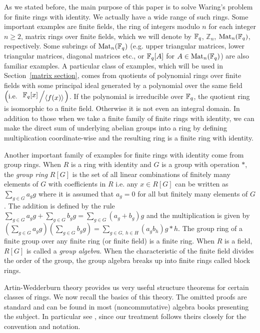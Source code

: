 \documentclass[11pt,reqno]{amsart}
\newcommand{\bigslant}[2]{{\raisebox{.2em}{$#1$}\left/\raisebox{-.2em}{$#2$}\right.}}
\begin{document}
As we stated before, the main purpose of this paper is to solve Waring's problem for finite rings with identity. We actually have a wide range of such rings. Some important examples are finite fields, the ring of integers modulo $n$ for each integer $n\geqslant 2$, matrix rings over finite fields, which we will denote by $\Bbb F_q$, $\mathbb{Z}_{n}$, $\operatorname{Mat}_n(\Bbb F_q)$, respectively. Some subrings of $\operatorname{Mat}_n(\Bbb F_q)$ (e.g. upper triangular matrices, lower triangular matrices, diagonal matrices etc., or $\Bbb F_q[A]$ for $A \in \operatorname{Mat}_n(\Bbb F_q)$) are also familiar examples. A particular class of examples, which will be used in Section~\ref{matrix section}, comes from quotients of polynomial rings over finite fields with some principal ideal generated by a polynomial over the same field $\left( \text{i.e. } \ \bigslant{\Bbb F_q[x]}{\langle f(x) \rangle} \right)$. If the polynomial is irreducible over $\Bbb F_q$, the quotient ring is isomorphic to a finite field. Otherwise it is not even an integral domain. In addition to those when we take a finite family of finite rings with identity, we can make the direct sum of underlying abelian groups into a ring by defining multiplication coordinate-wise and the resulting ring is a finite ring with identity.

Another important family of examples for finite rings with identity come from group rings. When $R$ is a ring with identity and $G$ is a group with operation $\ast$, the \emph{group ring} $R[G]$ is the set of all linear combinations of finitely many elements of $G$ with coefficients in $R$ i.e. any $x \in R[G]$ can be written as $\sum_{g \in G} a_{g} g$ where it is assumed that $a_g=0$ for all but finitely many elements of $G$. The addition is defined by the rule $\sum_{g \in G} a_{g} g + \sum_{g \in G} b_{g} g= \sum_{g \in G} (a_{g}+b_{g}) g$ and the multiplication is given by $\left(\sum_{g \in G} a_{g} g \right) \left( \sum_{g \in G} b_{g} g \right)=  \sum_{g \in G, \  h \in H} (a_{g}b_{h}) g \ast h$. The group ring of a finite group over any finite ring (or finite field) is a finite ring. When $R$ is a field, $R[G]$ is called a \emph{group algebra}. When the characteristic of the finite field divides the order of the group, the group algebra breaks up into finite rings called block rings.  

Artin-Wedderburn theory provides us very useful structure theorems for certain classes of rings. We now recall the basics of this theory. The omitted proofs are standard and can be found in most (noncommutative) algebra books presenting the subject. In particular see \cite{Farb-Algebra}, \cite{Hungerford} since our treatment follows theirs closely for the convention and notation.
\end{document}
